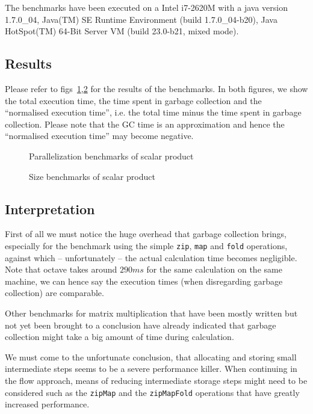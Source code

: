 \documentclass[runningheads,a4paper,fleqn]{llncs}
\begin{document}
The benchmarks have been executed on a Intel i7-2620M with a java
version 1.7.0\_04, Java(TM) SE Runtime Environment (build
1.7.0\_04-b20), Java HotSpot(TM) 64-Bit Server VM (build 23.0-b21,
mixed mode).

\subsection{Results}

Please refer to figs~\ref{fig:par-bench},\ref{fig:size-bench} for the
results of the benchmarks. In both figures, we show the total
execution time, the time spent in garbage collection and the
``normalised execution time'', i.e. the total time minus the time
spent in garbage collection. Please note that the GC time is an
approximation and hence the ``normalised execution time'' may become
negative.

\begin{figure}
\caption{Parallelization benchmarks of scalar product}
\label{fig:par-bench}
\end{figure}

\begin{figure}
\caption{Size benchmarks of scalar product}
\label{fig:size-bench}
\end{figure}

\subsection{Interpretation}
First of all we must notice the huge overhead that garbage collection
brings, especially for the benchmark using the simple \texttt{zip},
\texttt{map} and \texttt{fold} operations, against which --
unfortunately -- the actual calculation time becomes negligible. Note
that octave \cite{eaton1997gnu} takes around $290 ms$ for the same
calculation on the same machine, we can hence say the execution times
(when disregarding garbage collection) are comparable.

Other benchmarks for matrix multiplication that have been mostly
written but not yet been brought to a conclusion have already
indicated that garbage collection might take a big amount of time
during calculation.

We must come to the unfortunate conclusion, that allocating and
storing small intermediate steps seems to be a severe performance
killer. When continuing in the flow approach, means of reducing
intermediate storage steps might need to be considered such as the
\texttt{zipMap} and the \texttt{zipMapFold} operations that have
greatly increased performance.
\end{document}
